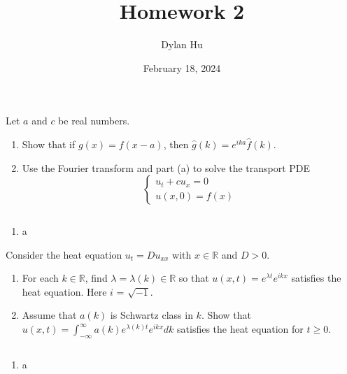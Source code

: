 \documentclass[plain]{pset}
\title{Homework 2}
\author{Dylan Hu}
\date{February 18, 2024}
\begin{document}
\begin{multicols}{2}
    \raggedcolumns{}
    \maketitle
    \columnbreak{}
    \tableofcontents
\end{multicols}

\setlength{\parskip}{1em}

\pagebreak

\begin{problem}
Let \(a\) and \(c\) be real numbers.
\begin{enumerate}[label = (\alph*)]
    \item Show that if \(g(x) = f(x - a)\), then \(\hat{g}(k) = e^{ika}\hat{f}(k)\).
    \item Use the Fourier transform and part (a) to solve the transport PDE
          \[
              \begin{cases}
                  u_t + cu_x = 0 \\
                  u(x, 0) = f(x)
              \end{cases}
          \]
\end{enumerate}
\end{problem}
\begin{solution}
    \[\]
    \vspace*{-4em}
    \begin{enumerate}[label = (\alph*)]
        \item a
    \end{enumerate}
\end{solution}

\pagebreak

\begin{problem}
Consider the heat equation \(u_t = Du_{xx}\) with \(x \in \mathbb{R}\) and \(D > 0\).
\begin{enumerate}[label = (\alph*)]
    \item For each \(k \in \mathbb{R}\), find \(\lambda = \lambda(k) \in \mathbb{R}\) so that \(u(x, t) = e^{\lambda t}e^{ikx}\) satisfies the heat equation. Here \(i\) = \(\sqrt{-1}\).
    \item Assume that \(a(k)\) is Schwartz class in \(k\). Show that \(u(x, t) = \int_{-\infty}^{\infty} a(k)e^{\lambda(k)t}e^{ikx}dk\) satisfies the heat equation for \(t \geq 0\).
\end{enumerate}
\end{problem}
\begin{solution}
    \[\]
    \vspace*{-4em}
    \begin{enumerate}[label = (\alph*)]
        \item a
    \end{enumerate}
\end{solution}
\end{document}
